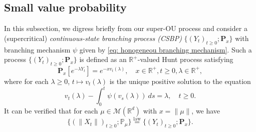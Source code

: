 \documentclass[12pt,a4paper]{amsart}
\theoremstyle{plain}
\theoremstyle{definition}
\numberwithin{equation}{section}
\begin{document}
\subsection{Small value probability}
\label{sec: Small value probability}
In this subsection, we digress briefly from our super-OU process and consider a (supercritical) \emph{continuous-state branching process (CSBP)} $\{(Y_t)_{t\geq 0}; \mathbf P_x\}$ with branching mechanism $\psi$ given by \eqref{eq: honogeneou branching mechanism}.
Such a process $\{(Y_t)_{t\geq 0}; \mathbf P_x\}$ is defined as an $\mathbb R^+$-valued Hunt process satisfying 
\[
  \mathbf P_x[e^{-\lambda Y_t}] = e^{- x v_t(\lambda)},
  \quad x\in \mathbb R^+, t\geq 0, \lambda \in \mathbb R^+,
\]
where for each $\lambda\geq 0$, $t\mapsto v_t(\lambda)$ is the unique positive solution to the equation
\begin{equation}
  \label{eq: fkpp equation for CSBP}
  v_t(\lambda) - \int_0^t \psi(v_s(\lambda))~ds = \lambda,
  \quad t\geq 0.
\end{equation}
It can be verified that for each $\mu \in \mathcal M(\mathbb R^d)$ with $x = \| \mu \|$, we have
\[
  \{(\|X_t\|)_{t\geq 0}; \mathbb P_\mu\}
  \overset{\text{law}}{=} \{(Y_t)_{t\geq 0}; \mathbf P_x\}.
\]
\end{document}
